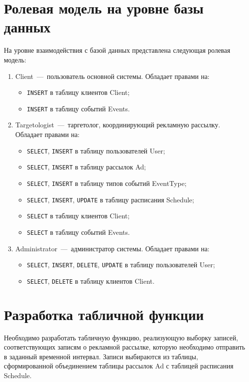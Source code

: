 \section{Ролевая модель на уровне базы данных}
На уровне взаимодействия с базой данных представлена следующая ролевая модель:
\begin{enumerate}
	\item Client~---~пользователь основной системы. Обладает правами на: \begin{itemize}
		\item \texttt{INSERT} в таблицу клиентов Client;
		\item \texttt{INSERT} в таблицу событий Events.
		\end{itemize}
	\item Targetologist~---~таргетолог, координирующий рекламную рассылку. Обладает правами на: \begin{itemize}
		\item \texttt{SELECT}, \texttt{INSERT} в таблицу пользователей User;
		\item \texttt{SELECT}, \texttt{INSERT} в таблицу рассылок Ad;
		\item \texttt{SELECT}, \texttt{INSERT} в таблицу типов событий EventType;
		\item \texttt{SELECT}, \texttt{INSERT}, \texttt{UPDATE} в таблицу расписания Schedule;
		\item \texttt{SELECT} в таблицу клиентов Client;
		\item \texttt{SELECT} в таблицу событий Events.
		\end{itemize}
	\item Administrator~---~администратор системы. Обладает правами на: \begin{itemize}
		\item \texttt{SELECT}, \texttt{INSERT}, \texttt{DELETE}, \texttt{UPDATE} в таблицу пользователей User;
		\item \texttt{SELECT}, \texttt{DELETE} в таблицу клиентов Client.
		\end{itemize}
\end{enumerate}

\section{Разработка табличной функции}
Необходимо разработать табличную функцию, реализующую выборку записей, соответствующих записям о рекламной рассылке, которую необходимо отправить в заданный временной интервал. Записи выбираются из таблицы, сформированной объединением таблицы рассылок Ad с таблицей расписания Schedule.

